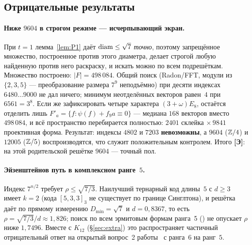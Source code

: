 \subsection{Отрицательные результаты}\label{ssec:dim912neg}

\paragraph{Ниже $9604$ в строгом режиме --- исчерпывающий экран.}
При $t=1$ лемма~\ref{lem:P1} даёт $\operatorname{diam}\le\sqrt7$ \emph{точно}, поэтому
запрещённое множество, построенное против этого диаметра, делает строгой любую
найденную против него раскраску, и искать можно по всем подрешёткам. Множество
построено: $|F|=498\,084$. Общий поиск (Radon/FFT, модули из $\{2,3,5\}$ ---
преобразование размера $7^9$ неподъёмно) при десяти индексах $6480\dots9000$ не
дал ничего; минимум неотделённых векторов равен~$4$ при $6561=3^8$. Если же
зафиксировать четыре характера $(3+\omega)E_8$, остаётся отделить лишь
$F'_a=\{f:\psi(f)+f_9a\equiv0\}$ --- медиана $168$ векторов вместо
$498\,084$, и всё пространство перебирается полностью: $2401$ склейка
$\times\,9841$ проективная форма. Результат: индексы $4802$ и $7203$
\textbf{невозможны}, а $9604$ ($\mathbb{Z}/4$) и $12005$ ($\mathbb{Z}/5$) воспроизводятся, что
служит положительным контролем. Итого \textbf{[Э]}: на этой родительской решётке
$9604$ --- точный пол.

\paragraph{Эйзенштейнов путь в комплексном ранге~$5$.}
Индекс $7^{n/2}$ требует $\rho\le\sqrt{7/3}$. Наилучший тернарный код длины~$5$
с $d\ge3$ имеет $k=2$ (кода $[5,3,3]_3$ не существует по границе Синглтона), и
решётка даёт по прямому измерению $D_{\min}=\sqrt7$ и $d=0{,}8367$, то есть
$\rho=\sqrt{7/3}/d\approx1{,}826$; поиск по всем эрмитовым формам ранга~5
() не опускает $\rho$
ниже $1{,}7496$. Вместе с $K_{12}$ (\S\ref{sec:extra}) это
распространяет частичный отрицательный ответ на открытый вопрос~2
работы~\cite{ABPR} с ранга~$6$ на ранг~$5$.


